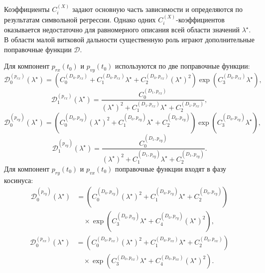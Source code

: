 Коэффициенты $C_i^{(X)}$ задают основную часть зависимости и определяются по результатам символьной регрессии. Однако одних $C_i^{(X)}$-коэффициентов оказывается недостаточно для равномерного описания всей области значений $\lambda^\star$. В области малой витковой дальности существенную роль играют дополнительные поправочные функции $\mathcal D$.

Для компонент $p_{rx}(t_0)$ и $p_{vy}(t_0)$ используются по две поправочные функции:
\begin{equation}
	\mathcal D_0^{(p_{rx})}\left(\lambda^\star\right)=
	\left(
	C_0^{(D_0,p_{rx})}
	+
	C_1^{(D_0,p_{rx})}\lambda^\star
	+
	C_2^{(D_0,p_{rx})}\left(\lambda^\star\right)^2
	\right)
	\exp\left(
	C_3^{(D_0,p_{rx})}\lambda^\star
	\right),
\end{equation}
\begin{equation}
	\mathcal D_1^{(p_{rx})}\left(\lambda^\star\right)=
	\frac{
		C_0^{(D_1,p_{rx})}
	}{
		\left(\lambda^\star\right)^2
		+
		C_1^{(D_1,p_{rx})}\lambda^\star
		+
		C_2^{(D_1,p_{rx})}
	},
\end{equation}
\begin{equation}
	\mathcal D_0^{(p_{vy})}\left(\lambda^\star\right)=
	\left(
	C_0^{(D_0,p_{vy})}\left(\lambda^\star\right)^2
	+
	C_1^{(D_0,p_{vy})}\lambda^\star
	+
	C_2^{(D_0,p_{vy})}
	\right)
	\exp\left(
	C_3^{(D_0,p_{vy})}\lambda^\star
	\right),
\end{equation}
\begin{equation}
	\mathcal D_1^{(p_{vy})}\left(\lambda^\star\right)=
	\frac{
		C_0^{(D_1,p_{vy})}
	}{
		\left(\lambda^\star\right)^2
		+
		C_1^{(D_1,p_{vy})}\lambda^\star
		+
		C_2^{(D_1,p_{vy})}
	}.
\end{equation}
Для компонент $p_{ry}(t_0)$ и $p_{vx}(t_0)$ поправочные функции входят в фазу косинуса:
\begin{equation}
	\begin{split}
		\mathcal D_0^{(p_{ry})}\left(\lambda^\star\right)
		&=
		\left(
		C_0^{(D_0,p_{ry})}\left(\lambda^\star\right)^2
		+
		C_1^{(D_0,p_{ry})}\lambda^\star
		+
		C_2^{(D_0,p_{ry})}
		\right)\\
		&\quad{}\times
		\exp\left(
		C_3^{(D_0,p_{ry})}\lambda^\star
		+
		C_4^{(D_0,p_{ry})}\left(\lambda^\star\right)^2
		\right),
	\end{split}
\end{equation}
\begin{equation}
	\begin{split}
		\mathcal D_0^{(p_{vx})}\left(\lambda^\star\right)
		&=
		\left(
		C_0^{(D_0,p_{vx})}\left(\lambda^\star\right)^2
		+
		C_1^{(D_0,p_{vx})}\lambda^\star
		+
		C_2^{(D_0,p_{vx})}
		\right)\\
		&\quad{}\times
		\exp\left(
		C_3^{(D_0,p_{vx})}\lambda^\star
		+
		C_4^{(D_0,p_{vx})}\left(\lambda^\star\right)^2
		\right).
	\end{split}
\end{equation}

